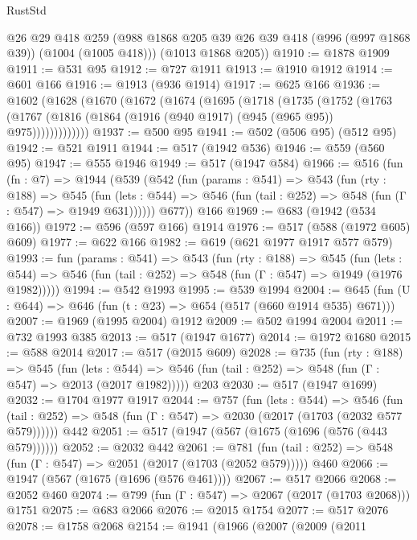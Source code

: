 \begin{lexlean}{RustStd}
\begin{coremodule}
      @26
      @29
      @418
      @259
      (@988 @1868 @205 @39 @26 @39 @418 (@996 (@997 @1868 @39)) (@1004 (@1005 @418)))
      (@1013 @1868 @205))
@1910 := @1878 @1909
@1911 := @531 @95
@1912 := @727 @1911
@1913 := @1910 @1912
@1914 := @601 @166
@1916 := @1913 (@936 @1914)
@1917 := @625 @166
@1936 := @1602
    (@1628
      (@1670
        (@1672
          (@1674
            (@1695
              (@1718
                (@1735
                  (@1752
                    (@1763
                      (@1767 (@1816 (@1864 (@1916 (@940 @1917) (@945 (@965 @95)) @975)))))))))))))
@1937 := @500 @95
@1941 := @502 (@506 @95) (@512 @95)
@1942 := @521 @1911
@1944 := @517 (@1942 @536)
@1946 := @559 (@560 @95)
@1947 := @555 @1946
@1949 := @517 (@1947 @584)
@1966 := @516
    (fun (fn : @7) =>
    @1944
      (@539
        (@542
          (fun (params : @541) =>
          @543
            (fun (rty : @188) =>
            @545
              (fun (lets : @544) =>
              @546 (fun (tail : @252) => @548 (fun (Γ : @547) => @1949 @631))))))
        @677))
    @166
@1969 := @683 (@1942 (@534 @166))
@1972 := @596 (@597 @166) @1914
@1976 := @517 (@588 (@1972 @605) @609)
@1977 := @622 @166
@1982 := @619 (@621 @1977 @1917 @577 @579)
@1993 := fun (params : @541) =>
  @543
    (fun (rty : @188) =>
    @545
      (fun (lets : @544) =>
      @546 (fun (tail : @252) => @548 (fun (Γ : @547) => @1949 (@1976 @1982)))))
@1994 := @542 @1993
@1995 := @539 @1994
@2004 := @645 (fun (U : @644) => @646 (fun (t : @23) => @654 (@517 (@660 @1914 @535) @671)))
@2007 := @1969 (@1995 @2004) @1912
@2009 := @502 @1994 @2004
@2011 := @732 @1993 @385
@2013 := @517 (@1947 @1677)
@2014 := @1972 @1680
@2015 := @588 @2014
@2017 := @517 (@2015 @609)
@2028 := @735
    (fun (rty : @188) =>
    @545
      (fun (lets : @544) =>
      @546 (fun (tail : @252) => @548 (fun (Γ : @547) => @2013 (@2017 @1982)))))
    @203
@2030 := @517 (@1947 @1699)
@2032 := @1704 @1977 @1917
@2044 := @757
    (fun (lets : @544) =>
    @546 (fun (tail : @252) => @548 (fun (Γ : @547) => @2030 (@2017 (@1703 (@2032 @577 @579))))))
    @442
@2051 := @517 (@1947 (@567 (@1675 (@1696 (@576 (@443 @579))))))
@2052 := @2032 @442
@2061 := @781
    (fun (tail : @252) => @548 (fun (Γ : @547) => @2051 (@2017 (@1703 (@2052 @579)))))
    @460
@2066 := @1947 (@567 (@1675 (@1696 (@576 @461))))
@2067 := @517 @2066
@2068 := @2052 @460
@2074 := @799 (fun (Γ : @547) => @2067 (@2017 (@1703 @2068))) @1751
@2075 := @683 @2066
@2076 := @2015 @1754
@2077 := @517 @2076
@2078 := @1758 @2068
@2154 := @1941
    (@1966
      (@2007
        (@2009
          (@2011

\end{coremodule}
\end{lexlean}
